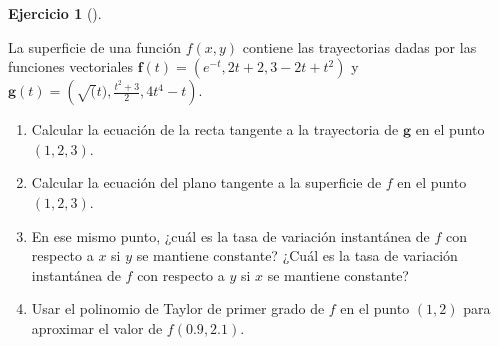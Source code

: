 \documentclass[
  spanish,
  a4paper,
]{scrreport}
\theoremstyle{definition}
\newtheorem{exercise}{Ejercicio}[chapter]
\theoremstyle{remark}
\begin{document}
\begin{exercise}[]\protect\hypertarget{exr-3}{}\label{exr-3}

La superficie de una función \(f(x,y)\) contiene las trayectorias dadas
por las funciones vectoriales \(\mathbf{f}(t)=(e^{-t}, 2t+2, 3-2t+t^2)\)
y \(\mathbf{g}(t)=\left(\sqrt(t), \frac{t^2+3}{2}, 4t^4-t\right)\).

\begin{enumerate}
\def\labelenumi{\alph{enumi}.}
\item
  Calcular la ecuación de la recta tangente a la trayectoria de
  \(\mathbf{g}\) en el punto \((1,2,3)\).
\item
  Calcular la ecuación del plano tangente a la superficie de \(f\) en el
  punto \((1,2,3)\).
\item
  En ese mismo punto, ¿cuál es la tasa de variación instantánea de \(f\)
  con respecto a \(x\) si \(y\) se mantiene constante? ¿Cuál es la tasa
  de variación instantánea de \(f\) con respecto a \(y\) si \(x\) se
  mantiene constante?
\item
  Usar el polinomio de Taylor de primer grado de \(f\) en el punto
  \((1,2)\) para aproximar el valor de \(f(0.9, 2.1)\).
\end{enumerate}

\end{exercise}
\end{document}
